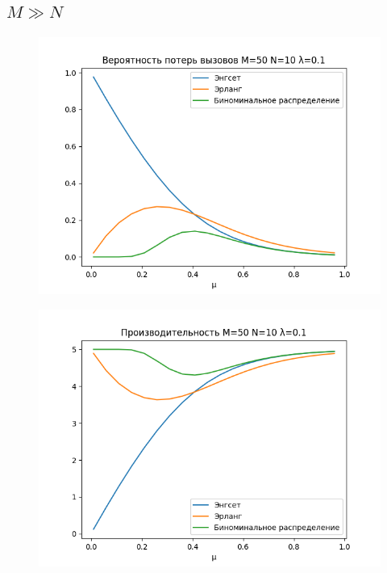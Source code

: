 \documentclass[12pt]{article}
\let\Oldsubsection\subsection
\renewcommand{\subsection}{\FloatBarrier\Oldsubsection}
\begin{document}
\subsection{$M ≫ N$}
\begin{figure}[!htb]
\centering
\includegraphics[scale=1.00]{assets/iss_2/loss_prob_M50_N10_lam01.png}
\caption{}
\label{}
\end{figure}

\begin{figure}[!htb]
\centering
\includegraphics[scale=1.00]{assets/iss_2/perf_M50_N10_lam01.png}
\caption{}
\label{}
\end{figure}
\end{document}
